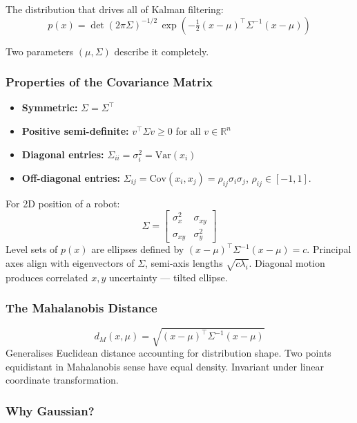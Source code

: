\documentclass[11pt,a4paper]{article}
\begin{document}
The distribution that drives all of Kalman filtering:
\begin{equation}
\boxed{\;p(x) = \det(2\pi \Sigma)^{-1/2}\,\exp\!\left(-\tfrac{1}{2}(x-\mu)^\top \Sigma^{-1}(x-\mu)\right)\;}
\end{equation}

Two parameters $(\mu, \Sigma)$ describe it completely.

\subsubsection{Properties of the Covariance Matrix}

\begin{itemize}
\item \textbf{Symmetric:} $\Sigma = \Sigma^\top$
\item \textbf{Positive semi-definite:} $v^\top \Sigma v \geq 0$ for all $v \in \mathbb{R}^n$
\item \textbf{Diagonal entries:} $\Sigma_{ii} = \sigma_i^2 = \mathrm{Var}(x_i)$
\item \textbf{Off-diagonal entries:} $\Sigma_{ij} = \mathrm{Cov}(x_i, x_j) = \rho_{ij}\sigma_i\sigma_j$, $\rho_{ij} \in [-1, 1]$.
\end{itemize}

For 2D position of a robot:
\[
\Sigma = \begin{bmatrix}\sigma_x^2 & \sigma_{xy} \\ \sigma_{xy} & \sigma_y^2\end{bmatrix}
\]
Level sets of $p(x)$ are ellipses defined by $(x-\mu)^\top \Sigma^{-1}(x-\mu) = c$. Principal axes align with eigenvectors of $\Sigma$, semi-axis lengths $\sqrt{c \lambda_i}$. Diagonal motion produces correlated $x, y$ uncertainty --- tilted ellipse.

\subsubsection{The Mahalanobis Distance}

\[
d_M(x, \mu) = \sqrt{(x-\mu)^\top \Sigma^{-1}(x-\mu)}
\]
Generalises Euclidean distance accounting for distribution shape. Two points equidistant in Mahalanobis sense have equal density. Invariant under linear coordinate transformation.

\subsubsection{Why Gaussian?}
\end{document}
